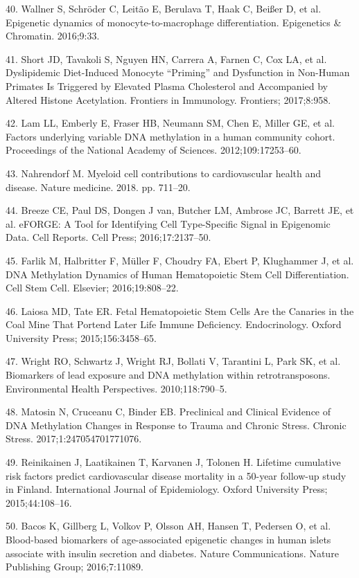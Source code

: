\documentclass[]{bmcart}
\begin{document}
40. Wallner S, Schr{ö}der C, Leit{ã}o E, Berulava T, Haak C, Bei{ß}er D,
et al. Epigenetic dynamics of monocyte-to-macrophage differentiation.
Epigenetics \& Chromatin. 2016;9:33.

41. Short JD, Tavakoli S, Nguyen HN, Carrera A, Farnen C, Cox LA, et al.
Dyslipidemic Diet-Induced Monocyte ``Priming'' and Dysfunction in
Non-Human Primates Is Triggered by Elevated Plasma Cholesterol and
Accompanied by Altered Histone Acetylation. Frontiers in Immunology.
Frontiers; 2017;8:958.

42. Lam LL, Emberly E, Fraser HB, Neumann SM, Chen E, Miller GE, et al.
Factors underlying variable DNA methylation in a human community cohort.
Proceedings of the National Academy of Sciences. 2012;109:17253--60.

43. Nahrendorf M. Myeloid cell contributions to cardiovascular health
and disease. Nature medicine. 2018. pp. 711--20.

44. Breeze CE, Paul DS, Dongen J van, Butcher LM, Ambrose JC, Barrett
JE, et al. eFORGE: A Tool for Identifying Cell Type-Specific Signal in
Epigenomic Data. Cell Reports. Cell Press; 2016;17:2137--50.

45. Farlik M, Halbritter F, M{ü}ller F, Choudry FA, Ebert P, Klughammer
J, et al. DNA Methylation Dynamics of Human Hematopoietic Stem Cell
Differentiation. Cell Stem Cell. Elsevier; 2016;19:808--22.

46. Laiosa MD, Tate ER. Fetal Hematopoietic Stem Cells Are the Canaries
in the Coal Mine That Portend Later Life Immune Deficiency.
Endocrinology. Oxford University Press; 2015;156:3458--65.

47. Wright RO, Schwartz J, Wright RJ, Bollati V, Tarantini L, Park SK,
et al. Biomarkers of lead exposure and DNA methylation within
retrotransposons. Environmental Health Perspectives. 2010;118:790--5.

48. Matosin N, Cruceanu C, Binder EB. Preclinical and Clinical Evidence
of DNA Methylation Changes in Response to Trauma and Chronic Stress.
Chronic Stress. 2017;1:247054701771076.

49. Reinikainen J, Laatikainen T, Karvanen J, Tolonen H. Lifetime
cumulative risk factors predict cardiovascular disease mortality in a
50-year follow-up study in Finland. International Journal of
Epidemiology. Oxford University Press; 2015;44:108--16.

50. Bacos K, Gillberg L, Volkov P, Olsson AH, Hansen T, Pedersen O, et
al. Blood-based biomarkers of age-associated epigenetic changes in human
islets associate with insulin secretion and diabetes. Nature
Communications. Nature Publishing Group; 2016;7:11089.
\end{document}
